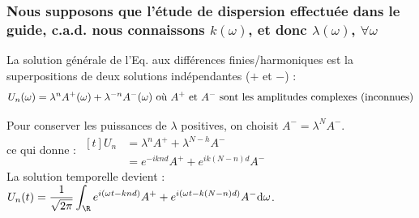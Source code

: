 \documentclass[12pt,a4paper]{article}
\begin{document}
\subsubsection{Nous supposons que l'étude de dispersion effectuée dans le guide, c.a.d. nous connaissons $k(\omega)$, et donc $\lambda(\omega)$, $\forall \omega$}
	
La solution générale de l'Eq. aux différences finies/harmoniques est la superpositions de deux solutions indépendantes ($+$ et $-$) :
\[
U_n(\omega) = \lambda^n A^+(\omega) + \lambda^{-n}A^-(\omega) \text{ où $ A^+$ et $A^-$ sont les amplitudes complexes (inconnues)}
\]

Pour conserver les puissances de $\lambda$ positives, on choisit $A^- = \lambda^N A^-$.\\
ce qui donne : $\begin{aligned}[t]
	U_n &= \lambda^n A^+ + \lambda^{N-h} A^- \\
	&= e^{-iknd}A^+ + e^{ik(N-n)d} A^-
\end{aligned}$\\
La solution temporelle devient : $U_n(t) = \dfrac1{\sqrt{2\pi}}\displaystyle\int_\R e^{i(\omega t - knd)} A^+ + e^{i(\omega t - k(N-n)d)}A^- \mathrm d\omega$.\\
\end{document}
